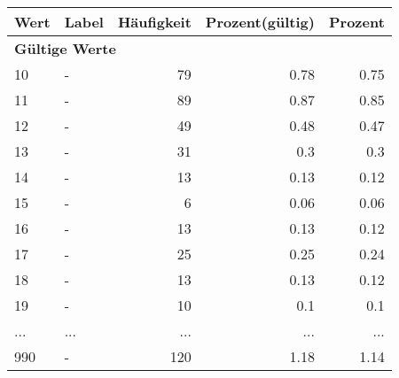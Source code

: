      \begin{longtable}{lXrrr}
     \toprule
     \textbf{Wert} & \textbf{Label} & \textbf{Häufigkeit} & \textbf{Prozent(gültig)} & \textbf{Prozent} \\
     \endhead
     \midrule
     \multicolumn{5}{l}{\textbf{Gültige Werte}}\\
        10 & \multicolumn{1}{X}{-} & %
          \num{79} &
          \num[round-mode=places,round-precision=2]{0.78} &
          \num[round-mode=places,round-precision=2]{0.75} \\
        11 & \multicolumn{1}{X}{-} & %
          \num{89} &
          \num[round-mode=places,round-precision=2]{0.87} &
          \num[round-mode=places,round-precision=2]{0.85} \\
        12 & \multicolumn{1}{X}{-} & %
          \num{49} &
          \num[round-mode=places,round-precision=2]{0.48} &
          \num[round-mode=places,round-precision=2]{0.47} \\
        13 & \multicolumn{1}{X}{-} & %
          \num{31} &
          \num[round-mode=places,round-precision=2]{0.3} &
          \num[round-mode=places,round-precision=2]{0.3} \\
        14 & \multicolumn{1}{X}{-} & %
          \num{13} &
          \num[round-mode=places,round-precision=2]{0.13} &
          \num[round-mode=places,round-precision=2]{0.12} \\
        15 & \multicolumn{1}{X}{-} & %
          \num{6} &
          \num[round-mode=places,round-precision=2]{0.06} &
          \num[round-mode=places,round-precision=2]{0.06} \\
        16 & \multicolumn{1}{X}{-} & %
          \num{13} &
          \num[round-mode=places,round-precision=2]{0.13} &
          \num[round-mode=places,round-precision=2]{0.12} \\
        17 & \multicolumn{1}{X}{-} & %
          \num{25} &
          \num[round-mode=places,round-precision=2]{0.25} &
          \num[round-mode=places,round-precision=2]{0.24} \\
        18 & \multicolumn{1}{X}{-} & %
          \num{13} &
          \num[round-mode=places,round-precision=2]{0.13} &
          \num[round-mode=places,round-precision=2]{0.12} \\
        19 & \multicolumn{1}{X}{-} & %
          \num{10} &
          \num[round-mode=places,round-precision=2]{0.1} &
          \num[round-mode=places,round-precision=2]{0.1} \\
       ... & ... & ... & ... & ... \\
        990 & \multicolumn{1}{X}{-} & %
          \num{120} &
          \num[round-mode=places,round-precision=2]{1.18} &
          \num[round-mode=places,round-precision=2]{1.14} \\


\end{longtable}
